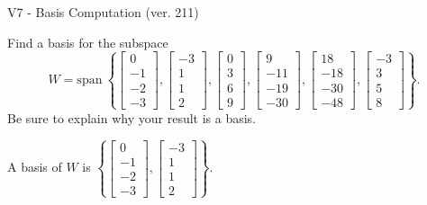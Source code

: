 \begin{exercise}
  \begin{exerciseTitle}V7 - Basis Computation (ver. 211)\end{exerciseTitle}
  \begin{exerciseStatement}
    Find a basis for the subspace 
\[W=\mathrm{span}\ \left\{\left[\begin{array}{r}
0 \\
-1 \\
-2 \\
-3
\end{array}\right] , \left[\begin{array}{r}
-3 \\
1 \\
1 \\
2
\end{array}\right] , \left[\begin{array}{r}
0 \\
3 \\
6 \\
9
\end{array}\right] , \left[\begin{array}{r}
9 \\
-11 \\
-19 \\
-30
\end{array}\right] , \left[\begin{array}{r}
18 \\
-18 \\
-30 \\
-48
\end{array}\right] , \left[\begin{array}{r}
-3 \\
3 \\
5 \\
8
\end{array}\right]\right\}.\]
 Be sure to explain why your result is a basis.


  \end{exerciseStatement}
  \begin{exerciseAnswer}
   A basis of \(W\) is  \(\left\{\left[\begin{array}{r}
0 \\
-1 \\
-2 \\
-3
\end{array}\right] , \left[\begin{array}{r}
-3 \\
1 \\
1 \\
2
\end{array}\right]\right\}\).
  


  \end{exerciseAnswer}
\end{exercise}